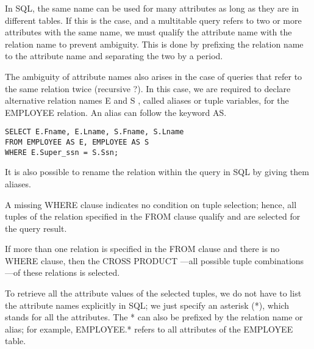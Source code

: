     \par In SQL, the same name can be used for many attributes as long as they are in different tables. If this is the case, and a multitable query refers to two or more attributes with the same name, we must qualify the attribute name with the relation name to prevent ambiguity. This is done by prefixing the relation name to the attribute name and separating the two by a period.
    \par The ambiguity of attribute names also arises in the case of queries that refer to the
same relation twice (recursive ?). In this case, we are required to declare alternative relation names E and S , called aliases or tuple variables, for the EMPLOYEE relation. An alias can follow the keyword AS.
      \begin{verbatim}
SELECT E.Fname, E.Lname, S.Fname, S.Lname
FROM EMPLOYEE AS E, EMPLOYEE AS S
WHERE E.Super_ssn = S.Ssn;
      \end{verbatim}
    \par It is also possible to rename the relation  within the query in SQL by giving them aliases.

    \par A missing WHERE clause indicates no condition on tuple selection; hence, all tuples of the relation specified in the FROM clause qualify and are selected for the query result.

    \par If more than one relation is specified in the FROM clause and there is no WHERE clause, then the CROSS PRODUCT —all possible tuple combinations—of these relations is selected.

    \par To retrieve all the attribute values of the selected tuples, we do not have to list the attribute names explicitly in SQL; we just specify an asterisk (*), which stands for all the attributes. The * can also be prefixed by the relation name or alias; for example, EMPLOYEE.* refers to all attributes of the EMPLOYEE table.

